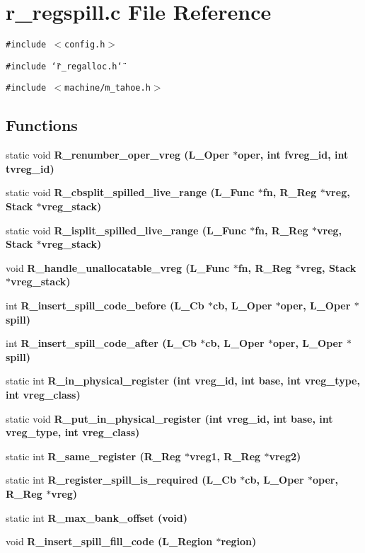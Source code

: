 \section{r\_\-regspill.c File Reference}
\label{r__regspill_8c}
{\tt \#include $<$config.h$>$}\par
{\tt \#include \char`\"{}r\_\-regalloc.h\char`\"{}}\par
{\tt \#include $<$machine/m\_\-tahoe.h$>$}\par
\subsection*{Functions}
\begin{CompactItemize}
\item 
static void \bf{R\_\-renumber\_\-oper\_\-vreg} (L\_\-Oper $\ast$oper, int fvreg\_\-id, int tvreg\_\-id)
\item 
static void \bf{R\_\-cbsplit\_\-spilled\_\-live\_\-range} (L\_\-Func $\ast$fn, \bf{R\_\-Reg} $\ast$vreg, \bf{Stack} $\ast$vreg\_\-stack)
\item 
static void \bf{R\_\-isplit\_\-spilled\_\-live\_\-range} (L\_\-Func $\ast$fn, \bf{R\_\-Reg} $\ast$vreg, \bf{Stack} $\ast$vreg\_\-stack)
\item 
void \bf{R\_\-handle\_\-unallocatable\_\-vreg} (L\_\-Func $\ast$fn, \bf{R\_\-Reg} $\ast$vreg, \bf{Stack} $\ast$vreg\_\-stack)
\item 
int \bf{R\_\-insert\_\-spill\_\-code\_\-before} (L\_\-Cb $\ast$cb, L\_\-Oper $\ast$oper, L\_\-Oper $\ast$spill)
\item 
int \bf{R\_\-insert\_\-spill\_\-code\_\-after} (L\_\-Cb $\ast$cb, L\_\-Oper $\ast$oper, L\_\-Oper $\ast$spill)
\item 
static int \bf{R\_\-in\_\-physical\_\-register} (int vreg\_\-id, int base, int vreg\_\-type, int vreg\_\-class)
\item 
static void \bf{R\_\-put\_\-in\_\-physical\_\-register} (int vreg\_\-id, int base, int vreg\_\-type, int vreg\_\-class)
\item 
static int \bf{R\_\-same\_\-register} (\bf{R\_\-Reg} $\ast$vreg1, \bf{R\_\-Reg} $\ast$vreg2)
\item 
static int \bf{R\_\-register\_\-spill\_\-is\_\-required} (L\_\-Cb $\ast$cb, L\_\-Oper $\ast$oper, \bf{R\_\-Reg} $\ast$vreg)
\item 
static int \bf{R\_\-max\_\-bank\_\-offset} (void)
\item 
void \bf{R\_\-insert\_\-spill\_\-fill\_\-code} (L\_\-Region $\ast$\bf{region})

\end{CompactItemize}
